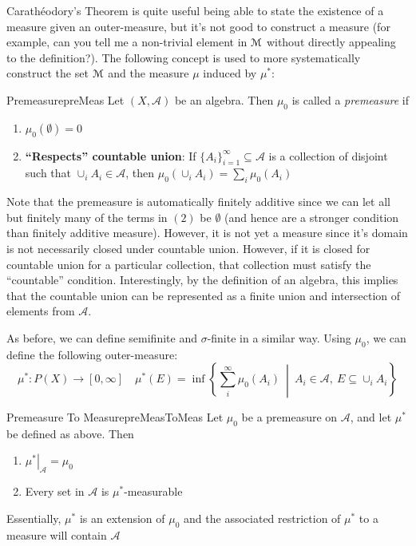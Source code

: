 \documentclass[oneside]{book}
\newcommand{\CA}{\mathcal{A}}
\newcommand{\MM}{\EuScript{M}}
\newcommand{\sse}{\subseteq}
\newcommand{\set}[2]{\left\{#1 \ \middle|\ #2\right\}}
\renewcommand{\bf}[1]{\textbf{#1}}
\newcommand{\rw}{\rightarrow}
\begin{document}
Carath\'eodory's Theorem is quite useful being able to state the existence of a measure given an outer-measure, but it's
not good to construct a measure (for example, can you tell me a non-trivial element in $\MM$ without directly appealing
to the definition?). The following concept is used to more systematically construct the set $\MM$ and the measure $\mu$
induced by $\mu^*$:

\begin{defn}{Premeasure}{preMeas}
	Let $(X, \CA)$ be an algebra. Then $\mu_0$ is called a \emph{premeasure} if
	\begin{enumerate}
		\item $\mu_0(\emptyset) = 0$
		\item \bf{``Respects'' countable union}: If $\{A_i\}_{i=1}^\infty \sse \CA$ is a collection of disjoint such
			that $\cup_i A_i \in \CA$, then $\mu_0(\cup_i A_i) = \sum_i \mu_0(A_i)$
	\end{enumerate}
\end{defn}

Note that the premeasure is automatically finitely additive since we can let all but finitely many of the terms in $(2)$
be $\emptyset$ (and hence are a stronger condition than finitely additive measure). However, it is not yet a measure
since it's domain is not necessarily closed under countable union. However, if it is closed for countable union for
a particular collection, that collection must satisfy the ``countable'' condition. Interestingly, by the definition of
an algebra, this implies that the countable union can be represented as a finite union and intersection of elements from
$\CA$. 

As before, we can define semifinite and $\sigma$-finite in a similar way. Using $\mu_0$, we can define the following
outer-measure:
\[
	\mu^*: P(X) \rw [0, \infty]\quad \mu^*(E) = \inf \set{\sum_i^\infty\mu_0(A_i)}{A_i \in \CA,\ E \sse \cup_i A_i}
\]

\begin{prop}{Premeasure To Measure}{preMeasToMeas}
	Let $\mu_0$ be a premeasure on $\CA$, and let $\mu^*$ be defined as above. Then
	\begin{enumerate}
		\item $\left.\mu^*\right|_{\CA} = \mu_0$
			\item Every set in $\CA$ is $\mu^*$-measurable
	\end{enumerate}
\end{prop}

Essentially, $\mu^*$ is an extension of $\mu_0$ and the associated restriction of $\mu^*$ to a measure will contain
$\CA$
\end{document}
